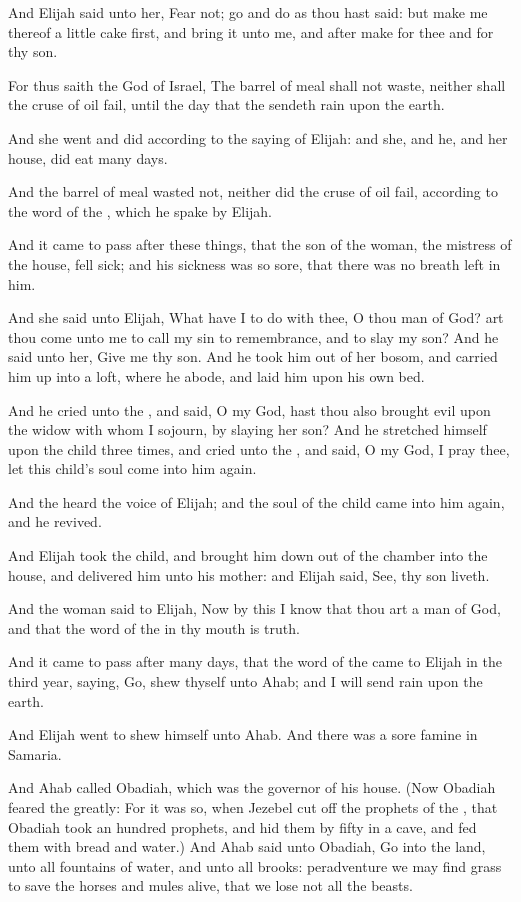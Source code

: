 \Verse And Elijah said unto her, Fear not; go and do as thou hast said: but make me thereof a little cake first, and bring it unto me, and after make for thee and for thy son.

\Verse For thus saith the \LORD God of Israel, The barrel of meal shall not waste, neither shall the cruse of oil fail, until the day that the \LORD sendeth rain upon the earth.

\Verse And she went and did according to the saying of Elijah: and she, and he, and her house, did eat many days.

\Verse And the barrel of meal wasted not, neither did the cruse of oil fail, according to the word of the \LORD, which he spake by Elijah.

\Verse And it came to pass after these things, that the son of the woman, the mistress of the house, fell sick; and his sickness was so sore, that there was no breath left in him.

\Verse And she said unto Elijah, What have I to do with thee, O thou man of God? art thou come unto me to call my sin to remembrance, and to slay my son?  \Verse And he said unto her, Give me thy son. And he took him out of her bosom, and carried him up into a loft, where he abode, and laid him upon his own bed.

\Verse And he cried unto the \LORD, and said, O \LORD my God, hast thou also brought evil upon the widow with whom I sojourn, by slaying her son?  \Verse And he stretched himself upon the child three times, and cried unto the \LORD, and said, O \LORD my God, I pray thee, let this child's soul come into him again.

\Verse And the \LORD heard the voice of Elijah; and the soul of the child came into him again, and he revived.

\Verse And Elijah took the child, and brought him down out of the chamber into the house, and delivered him unto his mother: and Elijah said, See, thy son liveth.

\Verse And the woman said to Elijah, Now by this I know that thou art a man of God, and that the word of the \LORD in thy mouth is truth.


\Chapter
\Verse And it came to pass after many days, that the word of the \LORD came to Elijah in the third year, saying, Go, shew thyself unto Ahab; and I will send rain upon the earth.

\Verse And Elijah went to shew himself unto Ahab. And there was a sore famine in Samaria.

\Verse And Ahab called Obadiah, which was the governor of his house.  (Now Obadiah feared the \LORD greatly: \Verse For it was so, when Jezebel cut off the prophets of the \LORD, that Obadiah took an hundred prophets, and hid them by fifty in a cave, and fed them with bread and water.)  \Verse And Ahab said unto Obadiah, Go into the land, unto all fountains of water, and unto all brooks: peradventure we may find grass to save the horses and mules alive, that we lose not all the beasts.

